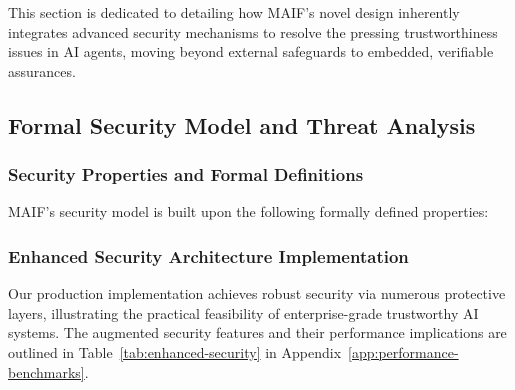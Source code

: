 \documentclass[conference]{IEEEtran}
\begin{document}
This section is dedicated to detailing how MAIF's novel design inherently integrates advanced security mechanisms to resolve the pressing trustworthiness issues in AI agents, moving beyond external safeguards to embedded, verifiable assurances.

\subsection{Formal Security Model and Threat Analysis}

\subsubsection{Security Properties and Formal Definitions}

MAIF's security model is built upon the following formally defined properties:

\subsubsection{Enhanced Security Architecture Implementation}

Our production implementation achieves robust security via numerous protective layers, illustrating the practical feasibility of enterprise-grade trustworthy AI systems. The augmented security features and their performance implications are outlined in Table~\ref{tab:enhanced-security} in Appendix~\ref{app:performance-benchmarks}.

\end{document}

